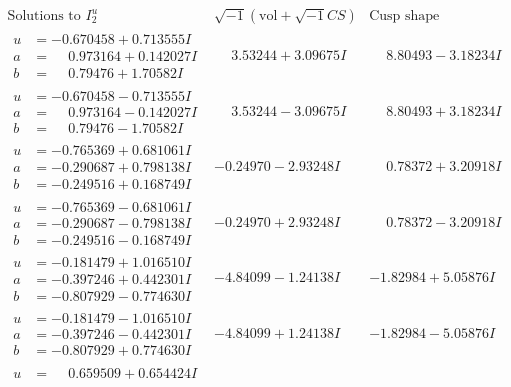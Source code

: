 \documentclass[1p]{elsarticle_modified}
\theoremstyle{definition}
\newcommand{\I}{\sqrt{-1}}
\begin{document}
$$\begin{array}{c|c|c}  
\text{Solutions to }I^u_{2}& \I (\text{vol} + \sqrt{-1}CS) & \text{Cusp shape}\\
 \hline 
\begin{aligned}
u &= -0.670458 + 0.713555 I \\
a &= \phantom{-}0.973164 + 0.142027 I \\
b &= \phantom{-}0.79476 + 1.70582 I\end{aligned}
 & \phantom{-}3.53244 + 3.09675 I & \phantom{-}8.80493 - 3.18234 I \\ \hline\begin{aligned}
u &= -0.670458 - 0.713555 I \\
a &= \phantom{-}0.973164 - 0.142027 I \\
b &= \phantom{-}0.79476 - 1.70582 I\end{aligned}
 & \phantom{-}3.53244 - 3.09675 I & \phantom{-}8.80493 + 3.18234 I \\ \hline\begin{aligned}
u &= -0.765369 + 0.681061 I \\
a &= -0.290687 + 0.798138 I \\
b &= -0.249516 + 0.168749 I\end{aligned}
 & -0.24970 - 2.93248 I & \phantom{-}0.78372 + 3.20918 I \\ \hline\begin{aligned}
u &= -0.765369 - 0.681061 I \\
a &= -0.290687 - 0.798138 I \\
b &= -0.249516 - 0.168749 I\end{aligned}
 & -0.24970 + 2.93248 I & \phantom{-}0.78372 - 3.20918 I \\ \hline\begin{aligned}
u &= -0.181479 + 1.016510 I \\
a &= -0.397246 + 0.442301 I \\
b &= -0.807929 - 0.774630 I\end{aligned}
 & -4.84099 - 1.24138 I & -1.82984 + 5.05876 I \\ \hline\begin{aligned}
u &= -0.181479 - 1.016510 I \\
a &= -0.397246 - 0.442301 I \\
b &= -0.807929 + 0.774630 I\end{aligned}
 & -4.84099 + 1.24138 I & -1.82984 - 5.05876 I \\ \hline\begin{aligned}
u &= \phantom{-}0.659509 + 0.654424 I \\

\end{aligned}
\end{array}$$
\end{document}
